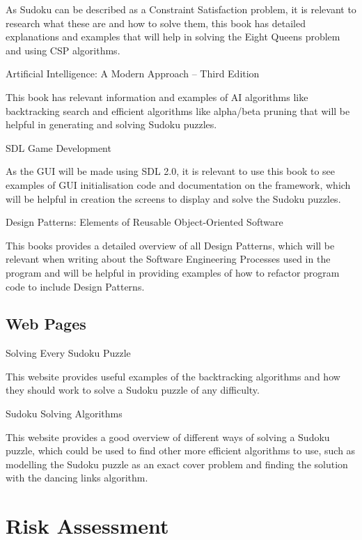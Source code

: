 \documentclass[]{final_report}
\begin{document}
As Sudoku can be described as a Constraint Satisfaction problem, it is relevant to research what these are and how to solve them, this book has detailed explanations and examples that will help in solving the Eight Queens problem and using CSP algorithms.

Artificial Intelligence: A Modern Approach -- Third Edition~\cite{RUSSELL:2016}

This book has relevant information and examples of AI algorithms like backtracking search and efficient algorithms like alpha/beta pruning that will be helpful in generating and solving Sudoku puzzles.

SDL Game Development~\cite{MITCHELL:2013}

As the GUI will be made using SDL 2.0, it is relevant to use this book to see examples of GUI initialisation code and documentation on the framework, which will be helpful in creation the screens to display and solve the Sudoku puzzles.

Design Patterns: Elements of Reusable Object-Oriented Software~\cite{GAMMA:1995}

This books provides a detailed overview of all Design Patterns, which will be relevant when writing about the Software Engineering Processes used in the program and will be helpful in providing examples of how to refactor program code to include Design Patterns.

\section*{Web Pages}

Solving Every Sudoku Puzzle~\cite{NORVIG:2019}

This website provides useful examples of the backtracking algorithms and how they should work to solve a Sudoku puzzle of any difficulty.

Sudoku Solving Algorithms~\cite{WIKIPEDIA:2019}

This website provides a good overview of different ways of solving a Sudoku puzzle, which could be used to find other more efficient algorithms to use, such as modelling the Sudoku puzzle as an exact cover problem and finding the solution with the dancing links algorithm.

\chapter*{Risk Assessment}
\end{document}

